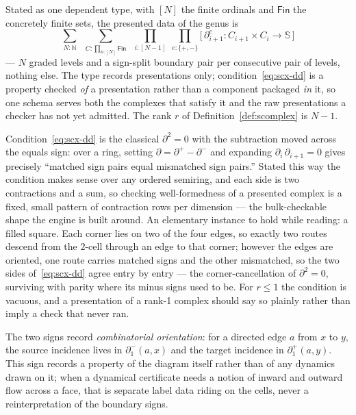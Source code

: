 Stated as one dependent type, with $[N]$ the finite ordinals and
$\mathsf{Fin}$ the concretely finite sets, the presented data of the
genus is
\[
\sum_{N \colon \mathbb{N}} \;\; \sum_{C \colon \prod_{n \colon [N]} \mathsf{Fin}} \;\; \prod_{i \colon [N-1]} \; \prod_{e \colon \{+,-\}} \big[\, \partial_{i+1}^{e} \colon C_{i+1} \times C_{i} \to \mathbb{S} \,\big]
\]
--- $N$ graded levels and a sign-split boundary pair per consecutive
pair of levels, nothing else. The type records presentations only;
condition~\eqref{eq:scx-dd} is a property checked \emph{of} a
presentation rather than a component packaged \emph{in} it, so one
schema serves both the complexes that satisfy it and the raw
presentations a checker has not yet admitted. The rank $r$ of
Definition~\ref{def:scomplex} is $N - 1$.

Condition~\eqref{eq:scx-dd} is the classical $\partial^2 = 0$ with
the subtraction moved across the equals sign: over a ring, setting
$\partial = \partial^{+} - \partial^{-}$ and expanding
$\partial_i\,\partial_{i+1} = 0$ gives precisely ``matched sign pairs
equal mismatched sign pairs.'' Stated this way the condition makes
sense over any ordered semiring, and each side is two contractions
and a sum, so checking well-formedness of a presented complex is a
fixed, small pattern of contraction rows per dimension --- the
bulk-checkable shape the engine is built around. An elementary
instance to hold while reading: a filled square. Each corner lies on
two of the four edges, so exactly two routes descend from the
$2$-cell through an edge to that corner; however the edges are
oriented, one route carries matched signs and the other mismatched,
so the two sides of~\eqref{eq:scx-dd} agree entry by entry --- the
corner-cancellation of $\partial^2 = 0$, surviving with parity where
its minus signs used to be. For $r \le 1$ the
condition is vacuous, and a presentation of a rank-1 complex should
say so plainly rather than imply a check that never ran.

The two signs record \emph{combinatorial orientation}: for a directed
edge $a$ from $x$ to $y$, the source incidence lives in
$\partial_1^{-}(a, x)$ and the target incidence in
$\partial_1^{+}(a, y)$. This sign records a property of the diagram
itself rather than of any dynamics drawn on it; when a dynamical
certificate needs a notion of inward and outward flow across a face,
that is separate label data riding on the cells, never a
reinterpretation of the boundary signs.


